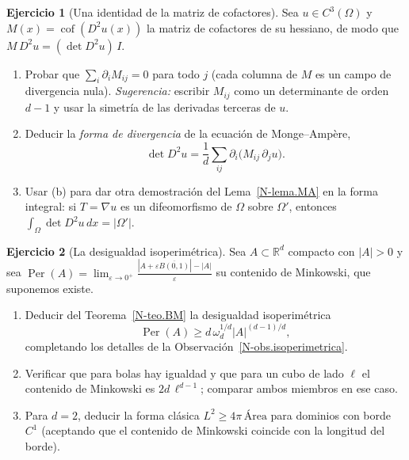 \documentclass[11pt,a4paper]{amsart}
\newcounter{chapter}
\newcommand{\ve}{\varepsilon}
\newcommand{\R}{{\mathbb R}}
\theoremstyle{remark}
\theoremstyle{definition}
\newtheorem{ejercicio}{Ejercicio}[chapter]
\numberwithin{subsection}{section}
\numberwithin{equation}{section}
\begin{document}
\begin{ejercicio}[Una identidad de la matriz de cofactores]\label{ejer.BM.cofactores}
Sea $u\in C^3(\Omega)$ y $M(x)=\operatorname{cof}(D^2u(x))$ la matriz de
cofactores de su hessiano, de modo que $M\,D^2u=(\det D^2u)\,I$.
\begin{enumerate}[label=(\alph*)]
\item Probar que $\sum_i\partial_iM_{ij}=0$ para todo $j$ (cada columna de
$M$ es un campo de divergencia nula). \emph{Sugerencia:} escribir
$M_{ij}$ como un determinante de orden $d-1$ y usar la simetría de las
derivadas terceras de $u$.
\item Deducir la \emph{forma de divergencia} de la ecuación de
Monge--Ampère,
\[
\det D^2u=\frac1d\sum_{ij}\partial_i\bigl(M_{ij}\,\partial_ju\bigr).
\]
\item Usar (b) para dar otra demostración del Lema~\ref{N-lema.MA} en la
forma integral: si $T=\nabla u$ es un difeomorfismo de $\Omega$ sobre
$\Omega'$, entonces $\int_\Omega\det D^2u\,dx=|\Omega'|$.
\end{enumerate}
\end{ejercicio}

\begin{ejercicio}[La desigualdad isoperimétrica]\label{ejer.BM.isoperimetrica}
Sea $A\subset\R^d$ compacto con $|A|>0$ y sea
$\operatorname{Per}(A)=\lim_{\ve\to0^+}\frac{|A+\ve\overline{B(0,1)}|-|A|}{\ve}$
su contenido de Minkowski, que suponemos existe.
\begin{enumerate}[label=(\alph*)]
\item Deducir del Teorema~\ref{N-teo.BM} la desigualdad isoperimétrica
\[
\operatorname{Per}(A)\ge d\,\omega_d^{1/d}|A|^{(d-1)/d},
\]
completando los detalles de la Observación~\ref{N-obs.isoperimetrica}.
\item Verificar que para bolas hay igualdad y que para un cubo de lado
$\ell$ el contenido de Minkowski es $2d\,\ell^{d-1}$; comparar ambos
miembros en ese caso.
\item Para $d=2$, deducir la forma clásica $L^2\ge4\pi\,\text{Área}$ para
dominios con borde $C^1$ (aceptando que el contenido de Minkowski coincide
con la longitud del borde).
\end{enumerate}
\end{ejercicio}
\end{document}
